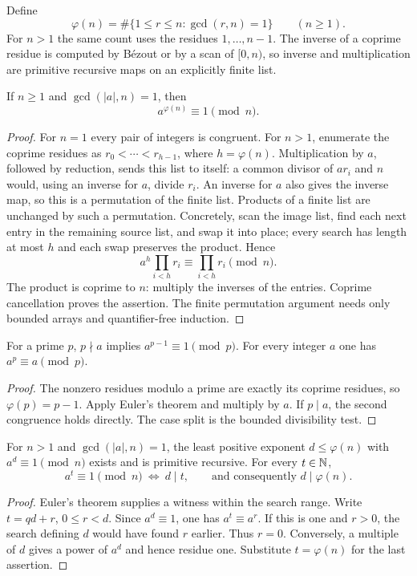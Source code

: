 Define
\[
 \varphi(n)=\#\{1\le r\le n:\gcd(r,n)=1\}\qquad(n\ge1).
\]
For $n>1$ the same count uses the residues $1,\ldots,n-1$.
The inverse of a coprime residue is computed by B\'ezout or by a scan
of $[0,n)$, so inverse and multiplication are primitive recursive maps
on an explicitly finite list.

\begin{theorem}\label{el:euler}
If $n\ge1$ and $\gcd(|a|,n)=1$, then
\[
                    a^{\varphi(n)}\equiv1\pmod n.
\]
\end{theorem}
\begin{proof}
For $n=1$ every pair of integers is congruent.  For $n>1$, enumerate
the coprime residues as $r_0<\cdots<r_{h-1}$, where $h=\varphi(n)$.
Multiplication by $a$, followed by reduction, sends this list to itself:
a common divisor of $ar_i$ and $n$ would, using an inverse for $a$,
divide $r_i$.  An inverse for $a$ also gives the inverse map, so this
is a permutation of the finite list.  Products of a finite list are
unchanged by such a permutation.  Concretely, scan the image list,
find each next entry in the remaining source list, and swap it into
place; every search has length at most $h$ and each swap preserves
the product.  Hence
\[
 a^h\prod_{i<h}r_i\equiv\prod_{i<h}r_i\pmod n.
\]
The product is coprime to $n$: multiply the inverses of the entries.
Coprime cancellation proves the assertion.  The finite permutation
argument needs only bounded arrays and quantifier-free induction.
\end{proof}

\begin{corollary}\label{el:fermat}
For a prime $p$, $p\nmid a$ implies $a^{p-1}\equiv1\pmod p$.
For every integer $a$ one has $a^p\equiv a\pmod p$.
\end{corollary}
\begin{proof}
The nonzero residues modulo a prime are exactly its coprime residues,
so $\varphi(p)=p-1$.  Apply Euler's theorem and multiply by $a$.
If $p\mid a$, the second congruence holds directly.  The case split
is the bounded divisibility test.
\end{proof}

\begin{theorem}\label{el:order}
For $n>1$ and $\gcd(|a|,n)=1$, the least positive exponent
$d\le\varphi(n)$ with $a^d\equiv1\pmod n$ exists and is primitive
recursive.  For every $t\in\mathbb N$,
\[
 a^t\equiv1\pmod n\ \Longleftrightarrow\ d\mid t,
 \qquad\text{and consequently }d\mid\varphi(n).
\]
\end{theorem}
\begin{proof}
Euler's theorem supplies a witness within the search range.  Write
$t=qd+r$, $0\le r<d$.  Since $a^d\equiv1$, one has
$a^t\equiv a^r$.  If this is one and $r>0$, the search defining $d$
would have found $r$ earlier.  Thus $r=0$.  Conversely, a multiple
of $d$ gives a power of $a^d$ and hence residue one.  Substitute
$t=\varphi(n)$ for the last assertion.
\end{proof}

